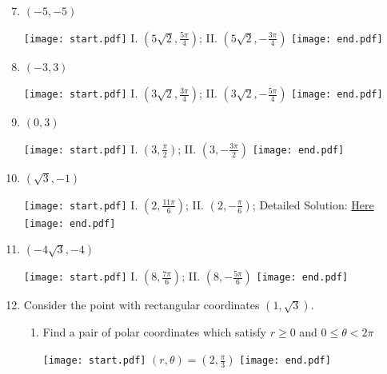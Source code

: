 \documentclass[12pt]{article}
\begin{document}
\newpage


\begin{enumerate}
\setcounter{enumi}{6}

\item $(-5, -5)$ 

\texttt{[image: start.pdf]}
{{I. $\left(5\sqrt{2},\frac{5\pi}{4}\right)$; II. $\left(5\sqrt{2},-\frac{3\pi}{4}\right)$}}
\texttt{[image: end.pdf]}


\item $(-3, 3)$ 

\texttt{[image: start.pdf]}
{{I. $\left(3\sqrt{2},\frac{3\pi}{4}\right)$; II. $\left(3\sqrt{2},-\frac{5\pi}{4}\right)$}}
\texttt{[image: end.pdf]}


\item $(0,3)$ 

\texttt{[image: start.pdf]}
{{I. $\left(3,\frac{\pi}{2}\right)$; II. $\left(3,-\frac{3\pi}{2}\right)$}}
\texttt{[image: end.pdf]}


\item $\left(\sqrt{3}, -1\right)$ 

\texttt{[image: start.pdf]}
{{I. $\left(2,\frac{11\pi}{6}\right)$; II. $\left(2,-\frac{\pi}{6}\right)$; Detailed Solution: \textcolor{blue}{\href{http://www.math.drexel.edu/classes/Calculus/resources/Math122HW/Solutions/122_18_Polar_10.pdf}{Here}}}}
\texttt{[image: end.pdf]}


\item $\left(-4\sqrt{3}, -4\right)$ 

\texttt{[image: start.pdf]}
{{I. $\left(8,\frac{7\pi}{6}\right)$; II. $\left(8,-\frac{5\pi}{6}\right)$}}
\texttt{[image: end.pdf]}


\item Consider the point with rectangular coordinates $\left(1,\sqrt{3}\right)$.

\begin{enumerate}

\item Find a pair of polar coordinates which satisfy $r \geq 0$ and $0 \leq \theta< 2\pi$

\texttt{[image: start.pdf]}
{{$(r,\theta)=\left(2,\frac{\pi}{3}\right)$}}
\texttt{[image: end.pdf]}



\end{enumerate}
\end{enumerate}
\end{document}
